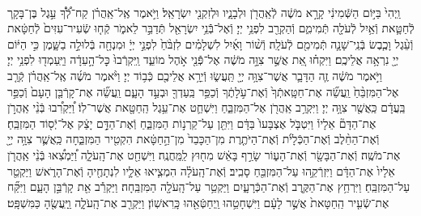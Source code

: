 \documentclass[twoside, openany, parskip=half, 11pt]{book}
\begin{document}
\begin{sometimes}
\begin{footnotesize}
\begin{multicols}{2}
\\
וַֽיְהִי֙ בַּיּ֣וֹם הַשְּֿׁמִינִ֔י קָרָ֣א מֹשֶׁ֔ה לְֿאַֽהֲרֹ֖ן וּלְבָנָ֑יו וּלְזִקְנֵ֖י יִשְׂרָאֵֽל׃ וַיֹּ֣אמֶר אֶֽל־אַֽהֲרֹ֗ן קַח־לְֿ֠ךָ֠ עֵ֣גֶל בֶּן־בָּקָ֧ר לְֿחַטָּ֛את וְֿאַ֥יִל לְֿעֹלָ֖ה תְּֿמִימִ֑ם וְֿהַקְרֵ֖ב לִפְנֵ֥י יְיָ׃ וְֿאֶל־בְּֿֿנֵ֥י יִשְׂרָאֵ֖ל תְּֿדַבֵּ֣ר לֵאמֹ֑ר קְֿח֤וּ שְֿׂעִיר־עִזִּים֙ לְֿחַטָּ֔את וְֿעֵ֨גֶל וָכֶ֧בֶשׂ בְּֿנֵֽי־שָׁנָ֛ה תְּֿמִימִ֖ם לְֿעֹלָֽה׃ וְֿשׁ֨וֹר וָאַ֜יִל לִשְׁלָמִ֗ים לִזְבֹּ֨חַ֙ לִפְנֵ֣י יְיָ֔ וּמִנְחָ֖ה בְּֿלוּלָ֣ה בַשָּׁ֑מֶן כִּ֣י הַיּ֔וֹם יְיָ֖ נִרְאָ֥ה אֲלֵיכֶֽם׃ וַיִּקְח֗וּ אֵ֚ת אֲשֶׁ֣ר צִוָּ֣ה מֹשֶׁ֔ה אֶל־פְּֿֿנֵ֖י אֹ֣הֶל מוֹעֵ֑ד וַֽיִּקְרְֿבוּ֙ כׇּל־הָ֣עֵדָ֔ה וַיַּֽעַמְד֖וּ לִפְנֵ֥י יְיָ׃ וַיֹּ֣אמֶר מֹשֶׁ֔ה זֶ֧ה הַדָּבָ֛ר אֲשֶׁר־צִוָּ֥ה יְיָ֖ תַּֽעֲשׂ֑וּ וְֿיֵרָ֥א אֲלֵיכֶ֖ם כְּֿב֥וֹד יְיָ׃  וַיֹּ֨אמֶר מֹשֶׁ֜ה אֶֽל־אַֽהֲרֹ֗ן קְֿרַ֤ב אֶל־הַמִּזְבֵּ֨חַ֙ וַֽעֲשֵׂ֞ה אֶת־חַטָּֽאתְֿךָ֙ וְֿאֶת־עֹ֣לָתֶ֔ךָ וְֿכַפֵּ֥ר בַּֽעַדְךָ֖ וּבְעַ֣ד הָעָ֑ם וַֽעֲשֵׂ֞ה אֶת־קָרְֿבַּ֤ן הָעָם֙ וְֿכַפֵּ֣ר בַּֽעֲדָ֔ם כַּֽאֲשֶׁ֖ר צִוָּ֥ה יְיָ׃ וַיִּקְרַ֥ב אַֽהֲרֹ֖ן אֶל־הַמִּזְבֵּ֑חַ וַיִּשְׁחַ֛ט אֶת־עֵ֥גֶל הַֽחַטָּ֖את אֲשֶׁר־לֽוֹ׃ וַ֠יַּקְרִ֠בוּ בְּֿנֵ֨י אַֽהֲרֹ֣ן אֶת־הַדָּם֘ אֵלָיו֒ וַיִּטְבֹּ֤ל אֶצְבָּעוֹ֙ בַּדָּ֔ם וַיִּתֵּ֖ן עַל־קַרְנ֣וֹת הַמִּזְבֵּ֑חַ וְֿאֶת־הַדָּ֣ם יָצַ֔ק אֶל־יְֿס֖וֹד הַמִּזְבֵּֽחַ׃ וְֿאֶת־הַחֵ֨לֶב וְֿאֶת־הַכְּֿלָיֹ֜ת וְֿאֶת־הַיֹּתֶ֤רֶת מִן־הַכָּבֵד֙ מִן־הַ֣חַטָּ֔את הִקְטִ֖יר הַמִּזְבֵּ֑חָה כַּֽאֲשֶׁ֛ר צִוָּ֥ה יְיָ֖ אֶת־מֹשֶֽׁה׃  וְֿאֶת־הַבָּשָׂ֖ר וְֿאֶת־הָע֑וֹר שָׂרַ֣ף בָּאֵ֔שׁ מִח֖וּץ לַֽמַּֽחֲנֶֽה׃ וַיִּשְׁחַ֖ט אֶת־הָֽעֹלָ֑ה וַ֠יַּמְצִ֠אוּ בְּֿנֵ֨י אַֽהֲרֹ֤ן אֵלָיו֙ אֶת־הַדָּ֔ם וַיִּזְרְֿקֵ֥הוּ עַל־הַמִּזְבֵּ֖חַ סָבִֽיב׃ וְֿאֶת־הָֽעֹלָ֗ה הִמְצִ֧יאוּ אֵלָ֛יו לִנְתָחֶ֖יהָ וְֿאֶת־הָרֹ֑אשׁ וַיַּקְטֵ֖ר עַל־הַמִּזְבֵּֽחַ׃ וַיִּרְחַ֥ץ אֶת־הַקֶּ֖רֶב וְֿאֶת־הַכְּֿרָעָ֑יִם וַיַּקְטֵ֥ר עַל־הָֽעֹלָ֖ה הַמִּזְבֵּֽחָה׃ וַיַּקְרֵ֕ב אֵ֖ת קָרְֿבַּ֣ן הָעָ֑ם וַיִּקַּ֞ח אֶת־שְֿׂעִ֤יר הַֽחַטָּאת֙ אֲשֶׁ֣ר לָעָ֔ם וַיִּשְׁחָטֵ֥הוּ וַֽיְחַטְּֿאֵ֖הוּ כָּֽרִאשֽׁוֹן׃ וַיַּקְרֵ֖ב אֶת־הָֽעֹלָ֑ה וַֽיַּֽעֲשֶׂ֖הָ כַּמִּשְׁפָּֽט׃


\end{multicols}
\end{footnotesize}
\end{sometimes}
\end{document}
